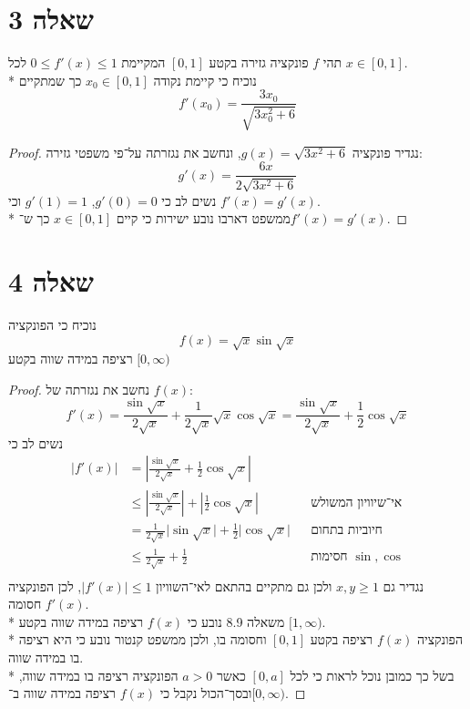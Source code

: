 \section{שאלה 3}
תהי $f$ פונקציה גזירה בקטע $[0, 1]$ המקיימת $0 \le f'(x) \le 1$ לכל $x \in [0, 1]$. \\*
נוכיח כי קיימת נקודה $x_0 \in [0, 1]$ כך שמתקיים
\[
	f'(x_0) = \frac{3x_0}{\sqrt{3x_0^2 + 6}}
\]
\begin{proof}
	נגדיר פונקציה $g(x) = \sqrt{3x^2 + 6}$, ונחשב את נגזרתה על־פי משפטי גזירה:
	\[
		g'(x) = \frac{6x}{2\sqrt{3x^2 + 6}}
	\]
	נשים לב כי $g'(0) = 0$, $g'(1) = 1$ וכי $f'(x) = g'(x)$. \\*
	ממשפט דארבו נובע ישירות כי קיים $x \in [0, 1]$ כך ש־$f'(x) = g'(x)$.
\end{proof}

\section{שאלה 4}
נוכיח כי הפונקציה
\[
	f(x) = \sqrt{x} \sin \sqrt{x}
\]
רציפה במידה שווה בקטע $[0, \infty)$ %
\begin{proof}
	נחשב את נגזרתה של $f(x)$:
	\[
		f'(x) = \frac{\sin \sqrt{x}}{2\sqrt{x}} + \frac{1}{2\sqrt{x}} \sqrt{x} \cos \sqrt{x}
		= \frac{\sin \sqrt{x}}{2\sqrt{x}} + \frac{1}{2} \cos \sqrt{x}
	\]
	נשים לב כי
	\begin{align*}
		|f'(x)|
		& = \left\lvert \frac{\sin \sqrt{x}}{2\sqrt{x}} + \frac{1}{2} \cos \sqrt{x} \right\rvert \\
		& \le \left\lvert \frac{\sin \sqrt{x}}{2\sqrt{x}} \right\rvert + \left\lvert \frac{1}{2} \cos \sqrt{x} \right\rvert && \text{אי־שיוויון המשולש} \\
		& = \frac{1}{2\sqrt{x}} \lvert \sin \sqrt{x} \rvert  + \frac{1}{2} \lvert \cos \sqrt{x} \rvert && \text{חיוביות בתחום} \\
		& \le \frac{1}{2\sqrt{x}} + \frac{1}{2} && \text{חסימות $\sin, \cos$} \\
	\end{align*}
	נגדיר גם $x, y \ge 1$ ולכן גם מתקיים בהתאם לאי־השוויון $|f'(x)| \le 1$, לכן הפונקציה $f'(x)$ חסומה. \\*
	משאלה 8.9 נובע כי $f(x)$ רציפה במידה שווה בקטע $[1, \infty)$. \\* %
	הפונקציה $f(x)$ רציפה בקטע $[0, 1]$ וחסומה בו, ולכן ממשפט קנטור נובע כי היא רציפה בו במידה שווה. \\*
	בשל כך כמובן נוכל לראות כי לכל $[0, a]$ כאשר $a > 0$ הפונקציה רציפה בו במידה שווה, ובסך־הכול נקבל כי $f(x)$ רציפה במידה שווה ב־$[0, \infty)$. %
\end{proof}

